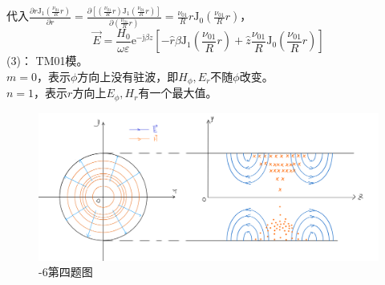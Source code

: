     代入$\frac{\partial r\mathrm{J}_1\left(\frac{\nu_{01}}{R}r\right)}{\partial r}=\frac{\partial\left[(\frac{\nu_{01}}{R}r)\mathrm{J}_1\left(\frac{\nu_{01}}{R}r\right)\right]}{\partial (\frac{\nu_{01}}{R}r)}=\frac{\nu_{01}}{R}r \mathrm{J}_0\left(\frac{\nu_{01}}{R}r\right)$，
    \begin{equation*}
        \vec{E}=\frac{H_0}{\omega\varepsilon}\mathrm{e}^{-\mathrm{j}\beta z}\left[-\hat{r}\beta \mathrm{J}_1\left(\frac{\nu_{01}}{R}r \right)+\hat{z}\frac{\nu_{01}}{R}\mathrm{J}_0\left(\frac{\nu_{01}}{R}r \right)\right]
    \end{equation*}
    (3)： TM{\scriptsize 01}模。\\
    $m=0$，表示$\phi$方向上没有驻波，即$H_\phi,E_r$不随$\phi$改变。\\$n=1$，表示$r$方向上$E_\phi,H_r$有一个最大值。
    \begin{figure}[htp]
        \centering
        \includegraphics[width=15cm]{figure/appendix/2-6(4).jpg}
        \caption{-6第四题图}\label{Fig: 2-6(4)}
    \end{figure}
    \\[15pt]
    \newpage
